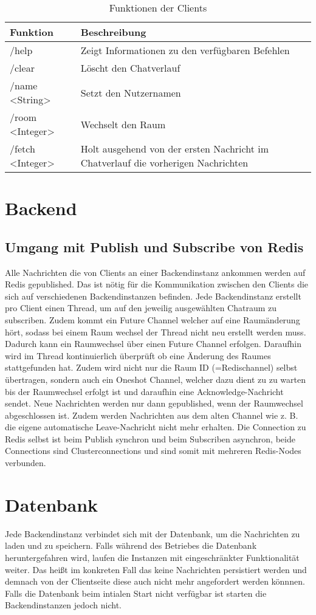 \begin{table}[h!]
\begin{center}
\begin{tabular}{ | l | m{10cm} | }
\hline
\textbf{Funktion} & \textbf{Beschreibung} \\ 
\hline
/help & Zeigt Informationen zu den verfügbaren Befehlen \\ 
\hline
/clear & Löscht den Chatverlauf \\ 
\hline
/name <String> & Setzt den Nutzernamen \\ 
\hline
/room <Integer> & Wechselt den Raum \\ 
\hline
/fetch <Integer> & Holt ausgehend von der ersten Nachricht im Chatverlauf die vorherigen Nachrichten \\ 
\hline
\end{tabular}
\end{center}
\caption{Funktionen der Clients}
\label{tab:clientcommands}
\end{table}

\section{Backend}
\subsection{Umgang mit Publish und Subscribe von Redis}
Alle Nachrichten die von Clients an einer Backendinstanz ankommen werden auf Redis gepublished.
Das ist nötig für die Kommunikation zwischen den Clients die sich auf verschiedenen Backendinstanzen befinden.
Jede Backendinstanz erstellt pro Client einen Thread, um auf den jeweilig ausgewählten Chatraum zu subscriben.
Zudem kommt ein Future Channel welcher auf eine Raumänderung hört, sodass bei einem Raum wechsel der Thread nicht neu erstellt werden muss.
Dadurch kann ein Raumwechsel über einen Future Channel erfolgen. Daraufhin wird im Thread kontinuierlich überprüft ob eine Änderung des Raumes stattgefunden hat.
Zudem wird nicht nur die Raum ID (=Redischannel) selbst übertragen, sondern auch ein Oneshot Channel, welcher dazu dient zu zu warten bis der Raumwechsel erfolgt ist und daraufhin eine Acknowledge-Nachricht sendet.
Neue Nachrichten werden nur dann gepublished, wenn der Raumwechsel abgeschlossen ist.
Zudem werden Nachrichten aus dem alten Channel wie z. B. die eigene automatische Leave-Nachricht nicht mehr erhalten.
Die Connection zu Redis selbst ist beim Publish synchron und beim Subscriben asynchron, beide Connections sind Clusterconnections und sind somit mit mehreren Redis-Nodes verbunden.

\section{Datenbank}
Jede Backendinstanz verbindet sich mit der Datenbank, um die Nachrichten zu laden und zu speichern.
Falls während des Betriebes die Datenbank heruntergefahren wird, laufen die Instanzen mit eingeschränkter Funktionalität weiter.
Das heißt im konkreten Fall das keine Nachrichten persistiert werden und demnach von der Clientseite diese auch nicht mehr angefordert werden könnnen.
Falls die Datenbank beim intialen Start nicht verfügbar ist starten die Backendinstanzen jedoch nicht.
